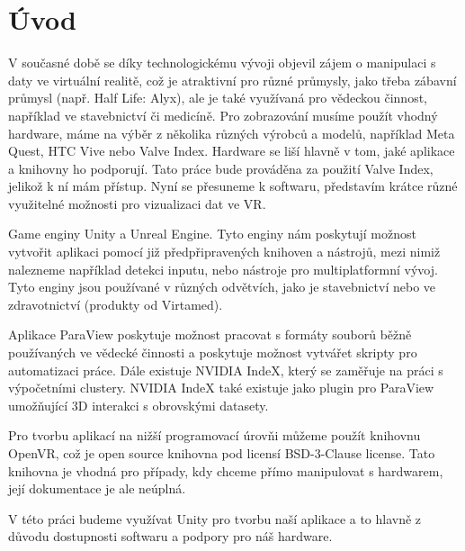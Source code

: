 \documentclass[a4paper,oneside,12pt]{book}
\begin{document}
\chapter*{Úvod} %
%
V současné době se díky technologickému vývoji objevil zájem o manipulaci s daty ve virtuální realitě, což je atraktivní pro různé průmysly, jako třeba zábavní průmysl (např. Half Life: Alyx\cite{EhojVv10CLuHHXEX}), ale je také využívaná pro vědeckou činnost, například ve stavebnictví\cite{unityvrstavebnictvi} či medicíně\cite{virtamed}. Pro zobrazování musíme použít vhodný hardware, máme na výběr z několika různých výrobců a modelů, například Meta Quest\cite{metaquest}, HTC Vive\cite{htcvive} nebo Valve Index\cite{valveindex}. Hardware se liší hlavně v tom, jaké aplikace a knihovny ho podporují. Tato práce bude prováděna za použití Valve Index\cite{valveindex}, jelikož k ní mám přístup. Nyní se přesuneme k softwaru, představím krátce různé využitelné možnosti pro vizualizaci dat ve VR.
\par{}Game enginy Unity\cite{unityvr} a Unreal Engine\cite{unrealvr}. Tyto enginy nám poskytují možnost vytvořit aplikaci pomocí již předpřipravených knihoven a nástrojů, mezi nimiž nalezneme například detekci inputu\cite{unityvrdokovladani}, nebo nástroje pro multiplatformní vývoj\cite{unitymulti}. Tyto enginy jsou používané v různých odvětvích, jako je stavebnictví\cite{unityvrstavebnictvi} nebo ve zdravotnictví (produkty od Virtamed\cite{virtamed}).
\par{}Aplikace ParaView\cite{paraviewvrdok} poskytuje možnost pracovat s formáty souborů běžně používaných ve vědecké činnosti a poskytuje možnost vytvářet skripty pro automatizaci práce\cite{paraviewscript}. Dále existuje NVIDIA IndeX, který se zaměřuje na práci s výpočetními clustery\cite{nvidiaindex}. NVIDIA IndeX také existuje jako plugin pro ParaView umožňující 3D interakci s obrovskými datasety\cite{nvidiaindexdok}.
\par{}Pro tvorbu aplikací na nižší programovací úrovňi můžeme použít knihovnu OpenVR\cite{openvrdok}, což je open source knihovna pod licensí BSD-3-Clause license\cite{openvrdok}. Tato knihovna je vhodná pro případy, kdy chceme přímo manipulovat s hardwarem\cite{openvrdok}, její dokumentace je ale neúplná.
\par{}V této práci budeme využívat Unity pro tvorbu naší aplikace a to hlavně z důvodu dostupnosti softwaru a podpory pro náš hardware\cite{unitypodpora}.
\end{document}
